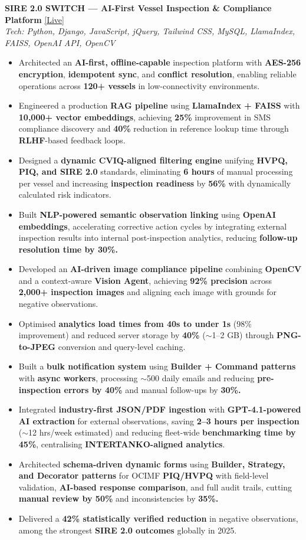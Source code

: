 \documentclass[letterpaper,9pt]{article}
\newcommand{\resumeItem}[1]{
  \item\small{#1}
}
\newcommand{\resumeItemListStart}{\begin{itemize}[leftmargin=0.18in, itemsep=0.5pt, topsep=1pt, parsep=0pt]}
\newcommand{\resumeItemListEnd}{\end{itemize}\vspace{-3pt}}
\newcommand{\mytilde}{$\sim$}
\begin{document}
      \vspace{2pt}
      \textbf{\small SIRE 2.0 SWITCH --- AI-First Vessel Inspection \& Compliance Platform} \href{https://sire2.bwesglobal.com/}{[Live]} \\
      \textit{\small Tech: Python, Django, JavaScript, jQuery, Tailwind CSS, MySQL, LlamaIndex, FAISS, OpenAI API, OpenCV}
      \resumeItemListStart
        \resumeItem{Architected an \textbf{AI-first, offline-capable} inspection platform with \textbf{AES-256 encryption}, \textbf{idempotent sync}, and \textbf{conflict resolution}, enabling reliable operations across \textbf{120+ vessels} in low-connectivity environments.}
        \resumeItem{Engineered a production \textbf{RAG pipeline} using \textbf{LlamaIndex + FAISS} with \textbf{10,000+ vector embeddings}, achieving \textbf{25\%} improvement in SMS compliance discovery and \textbf{40\%} reduction in reference lookup time through \textbf{RLHF}-based feedback loops.}
        \resumeItem{Designed a \textbf{dynamic CVIQ-aligned filtering engine} unifying \textbf{HVPQ, PIQ, and SIRE 2.0} standards, eliminating \textbf{6 hours} of manual processing per vessel and increasing \textbf{inspection readiness} by \textbf{56\%} with dynamically calculated risk indicators.}
        \resumeItem{Built \textbf{NLP-powered semantic observation linking} using \textbf{OpenAI embeddings}, accelerating corrective action cycles by integrating external inspection results into internal post-inspection analytics, reducing \textbf{follow-up resolution time by 30\%.}}
        \resumeItem{Developed an \textbf{AI-driven image compliance pipeline} combining \textbf{OpenCV} and a context-aware \textbf{Vision Agent}, achieving \textbf{92\% precision} across \textbf{2,000+ inspection images} and aligning each image with grounds for negative observations.}
        \resumeItem{Optimised \textbf{analytics load times from 40s to under 1s} (98\% improvement) and reduced server storage by \textbf{40\%} (\mytilde1--2 GB) through \textbf{PNG-to-JPEG} conversion and query-level caching.}
        \resumeItem{Built a \textbf{bulk notification system} using \textbf{Builder + Command patterns} with \textbf{async workers}, processing \mytilde500 daily emails and reducing \textbf{pre-inspection errors by 40\%} and manual follow-ups by \textbf{30\%.}}
        \resumeItem{Integrated \textbf{industry-first JSON/PDF ingestion} with \textbf{GPT-4.1-powered AI extraction} for external observations, saving \textbf{2--3 hours per inspection} (\mytilde12 hrs/week estimated) and reducing fleet-wide \textbf{benchmarking time by 45\%}, centralising \textbf{INTERTANKO-aligned analytics}.}
        \resumeItem{Architected \textbf{schema-driven dynamic forms} using \textbf{Builder, Strategy, and Decorator patterns} for OCIMF \textbf{PIQ/HVPQ} with field-level validation, \textbf{AI-based response comparison}, and full audit trails, cutting \textbf{manual review by 50\%} and inconsistencies by \textbf{35\%.}}
        \resumeItem{Delivered a \textbf{42\% statistically verified reduction} in negative observations, among the strongest \textbf{SIRE 2.0 outcomes} globally in 2025.}
      \resumeItemListEnd
\end{document}
